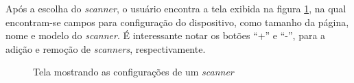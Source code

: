 Após a escolha do {\it scanner}, o usuário encontra a tela exibida na figura \ref{fig:config_2}, na qual encontram-se campos para configuração do dispositivo, como tamanho da página, nome e modelo do {\it scanner}. É interessante notar os botões ``+'' e ``-'', para a adição e remoção de {\it scanners}, respectivamente.

\begin{figure}[h]
 \centering
    \setlength\fboxsep{0pt}
    \setlength\fboxrule{0.5pt}
  \caption {Tela mostrando as configurações de um {\it scanner}}
  \label{fig:config_2}
\end{figure}
